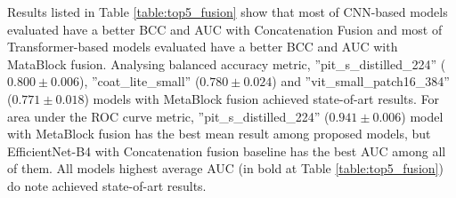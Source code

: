 \documentclass[conference]{IEEEtran}
\begin{document}
Results listed in Table \ref{table:top5_fusion} show that most of CNN-based models evaluated have a better BCC and AUC with Concatenation Fusion and most of Transformer-based models evaluated have a better BCC and AUC with MataBlock fusion. Analysing balanced accuracy metric, ''pit\_s\_distilled\_224'' ($0.800 \pm 0.006$), ''coat\_lite\_small'' ($0.780 \pm 0.024$) and ''vit\_small\_patch16\_384'' ($0.771 \pm 0.018$) models with MetaBlock fusion achieved state-of-art results. For area under the ROC curve metric, ''pit\_s\_distilled\_224'' ($0.941 \pm 0.006$) model with MetaBlock fusion has the best mean result among proposed models, but EfficientNet-B4 with Concatenation fusion baseline has the best AUC among all of them. All models highest average AUC (in bold at Table \ref{table:top5_fusion}) do note achieved state-of-art results.
\end{document}
